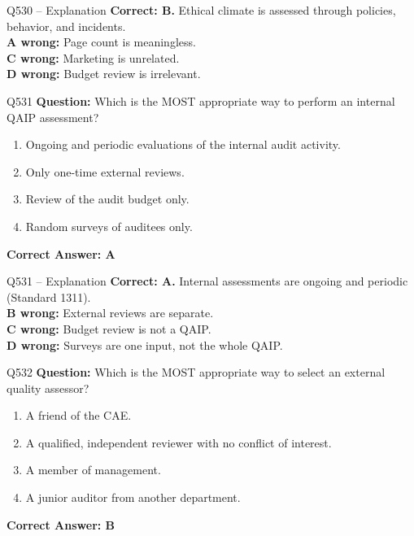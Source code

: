\documentclass[aspectratio=169,10pt]{beamer}
\begin{document}
	\begin{frame}[t]{Q530 -- Explanation}
		\small
		\textbf{Correct: B.} Ethical climate is assessed through policies, behavior, and incidents. \\[4pt]
		\textbf{A wrong:} Page count is meaningless. \\[2pt]
		\textbf{C wrong:} Marketing is unrelated. \\[2pt]
		\textbf{D wrong:} Budget review is irrelevant.
	\end{frame}
	
	\begin{frame}[t]{Q531}
		\small
		\textbf{Question:} Which is the MOST appropriate way to perform an internal QAIP assessment?
		\begin{enumerate}[label=\Alph*.,itemsep=1pt,topsep=2pt]
			\item Ongoing and periodic evaluations of the internal audit activity.
			\item Only one-time external reviews.
			\item Review of the audit budget only.
			\item Random surveys of auditees only.
		\end{enumerate}
		\vspace{4pt}
		\textbf{Correct Answer: A}
	\end{frame}
	
	\begin{frame}[t]{Q531 -- Explanation}
		\small
		\textbf{Correct: A.} Internal assessments are ongoing and periodic (Standard 1311). \\[4pt]
		\textbf{B wrong:} External reviews are separate. \\[2pt]
		\textbf{C wrong:} Budget review is not a QAIP. \\[2pt]
		\textbf{D wrong:} Surveys are one input, not the whole QAIP.
	\end{frame}
	
	\begin{frame}[t]{Q532}
		\small
		\textbf{Question:} Which is the MOST appropriate way to select an external quality assessor?
		\begin{enumerate}[label=\Alph*.,itemsep=1pt,topsep=2pt]
			\item A friend of the CAE.
			\item A qualified, independent reviewer with no conflict of interest.
			\item A member of management.
			\item A junior auditor from another department.
		\end{enumerate}
		\vspace{4pt}
		\textbf{Correct Answer: B}
	\end{frame}
	
\end{document}

